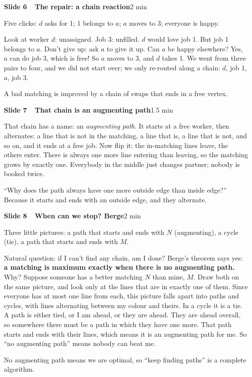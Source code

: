 \documentclass[11pt,a4paper]{article}
\newcommand{\slidehead}[3]{%
  \Needspace{9\baselineskip}\vspace{4pt}\noindent\colorbox{hkblue!12}{\parbox{\dimexpr\linewidth-2\fboxsep}{%
  \textbf{\color{hkblue}Slide #1\ \ #2}\hfill{\small\color{hkgrey}#3}}}\par\vspace{2pt}}
\begin{document}
\slidehead{6}{The repair: a chain reaction}{2 min}
\begin{onscreen}
Five clicks: $d$ asks for 1; 1 belongs to $a$; $a$ moves to 3; everyone is happy.
\end{onscreen}
\begin{say}
Look at worker $d$: unassigned. Job 3: unfilled. $d$ would love job 1. But job 1 belongs to $a$. Don't give up: ask $a$ to give it up. Can $a$ be happy elsewhere? Yes, $a$ can do job 3, which is free! So $a$ moves to 3, and $d$ takes 1. We went from three pairs to four, and we did not start over; we only re-routed along a chain: $d$, job 1, $a$, job 3.
\end{say}
\begin{key}A bad matching is improved by a chain of swaps that ends in a free vertex.\end{key}

\slidehead{7}{That chain is an augmenting path}{1.5 min}
\begin{say}
That chain has a name: an \emph{augmenting path}. It starts at a free worker, then alternates: a line that is not in the matching, a line that is, a line that is not, and so on, and it ends at a free job. Now flip it: the in-matching lines leave, the others enter. There is always one more line entering than leaving, so the matching grows by exactly one. Everybody in the middle just changes partner; nobody is booked twice.
\end{say}
\begin{ask}
``Why does the path always have one more outside edge than inside edge?'' Because it starts and ends with an outside edge, and they alternate.
\end{ask}

\slidehead{8}{When can we stop? Berge}{2 min}
\begin{onscreen}
Three little pictures: a path that starts and ends with $N$ (augmenting), a cycle (tie), a path that starts and ends with $M$.
\end{onscreen}
\begin{say}
Natural question: if I can't find any chain, am I done? Berge's theorem says yes: \textbf{a matching is maximum exactly when there is no augmenting path.}
Why? Suppose someone has a better matching $N$ than mine, $M$. Draw both on the same picture, and look only at the lines that are in exactly one of them. Since everyone has at most one line from each, this picture falls apart into paths and cycles, with lines alternating between my colour and theirs. In a cycle it is a tie. A path is either tied, or I am ahead, or they are ahead. They are ahead overall, so somewhere there must be a path in which they have one more. That path starts and ends with their lines, which means it is an augmenting path for me. So ``no augmenting path'' means nobody can beat me.
\end{say}
\begin{key}No augmenting path means we are optimal, so ``keep finding paths'' is a complete algorithm.\end{key}
\end{document}
